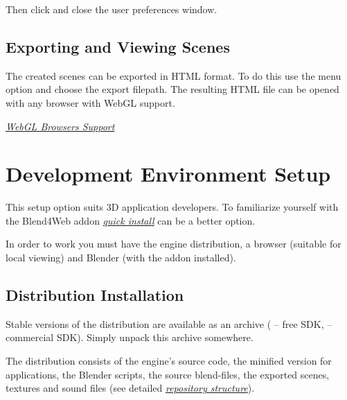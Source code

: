 \documentclass[a4paper,12pt,oneside]{sphinxmanual}
\begin{document}
Then click  and close the user preferences window.


\section{Exporting and Viewing Scenes}
\label{first_steps:first-step-export-view}\label{first_steps:id5}\label{first_steps:index-1}
The created scenes can be exported in HTML format. To do this use the  menu option and choose the export filepath. The resulting HTML file can be opened with any browser with WebGL support.




{\hyperref[about:browser-webgl-support]{\emph{WebGL Browsers Support}}}




\chapter{Development Environment Setup}
\label{setup:setup}\label{setup::doc}\label{setup:index-2}\label{setup:id1}
This setup option suits 3D application developers. To familiarize yourself with the Blend4Web addon {\hyperref[first_steps:first-steps]{\emph{quick install}}} can be a better option.

In order to work you must have the engine distribution, a browser (suitable for local viewing) and Blender (with the addon installed).


\section{Distribution Installation}
\label{setup:getting-started-distribution}\label{setup:id2}
Stable versions of the distribution are available as an archive ( -- free SDK,  -- commercial SDK). Simply unpack this archive somewhere.

The distribution consists of the engine's source code, the minified version for applications, the Blender scripts, the source blend-files, the exported scenes, textures and sound files (see detailed {\hyperref[developers:repo-file-structure]{\emph{repository structure}}}).

\end{document}
